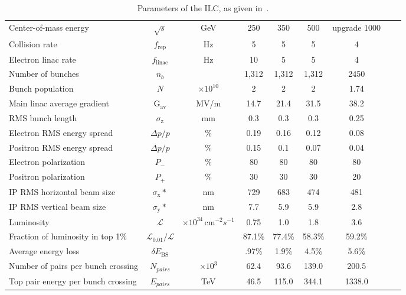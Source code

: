         \begin{landscape}
        \begin{table}
        \begin{center}
        \begin{tabular}{|lcc|c|c|c|c|c|c|}
                \hline
                Center-of-mass energy &$\sqrt{s}$ &GeV  			& 250 & 350 & 500 & upgrade 1000 \\ 
                Collision rate &$f_{\text{rep}}$ &Hz  				& 5 & 5 & 5 & 4 \\ 
                Electron linac rate &$f_{\text{linac}}$ &Hz  		& 10 & 5 & 5 & 4 \\ 
                Number of bunches &$n_b$ &							& 1,312 & 1,312 & 1,312 & 2450 \\ 
                Bunch population &$N$ &$\times 10^{10}$ 			& 2 & 2 & 2 & 1.74 \\ 
                Main linac average gradient &G$_{\text{av}}$ &MV/m  & 14.7 & 21.4 & 31.5 & 38.2 \\  \hline

                RMS bunch length &$\sigma_{\text{z}}$ &mm 			& 0.3 & 0.3 & 0.3 & 0.25 \\ 
                Electron RMS energy spread &$\Delta p/p$ &\%  		& 0.19 & 0.16 & 0.12 & 0.08 \\ 
                Positron RMS energy spread &$\Delta p/p$ &\%  		& 0.15 & 0.1 & 0.07 & 0.04 \\ 
                Electron polarization &$P_-$ &\%  					& 80 & 80 & 80 & 80 \\ 
                Positron polarization &$P_+$ &\%  					& 30 & 30 & 30 & 20 \\ 
                IP RMS horizontal beam size &$\sigma_{\text{x}}*$ &nm& 729 & 683 & 474 & 481 \\ 

                IP RMS vertical beam size &$\sigma_{\text{y}}*$ &nm  & 7.7 & 5.9 & 5.9 & 2.8 \\ \hline
                Luminosity &$\mathcal{L}$ &$\times 10^{34}$\,cm$^{-2}s^{-1}$ & 0.75 & 1.0 & 1.8 & 3.6 \\ 
                Fraction of luminosity in top 1\% &$\mathcal{L}_{0.01}/\mathcal{L}$ & & 87.1\% & 77.4\% & 58.3\% & 59.2\% \\ 
                Average energy loss &$\delta E_{\text{BS}}$&  & .97\% & 1.9\% & 4.5\% & 5.6\% \\  \hline
				Number of pairs per bunch crossing &$N_{pairs}$ &$\times 10^3$ & 62.4 & 93.6 & 139.0 & 200.5 \\ 
                Top pair energy per bunch crossing &$E_{pairs}$ &TeV & 46.5 & 115.0 & 344.1 & 1338.0 \\ \hline
        \end{tabular}
        \end{center}
        \caption{Parameters of the ILC, as given in~\cite{bib:ILC}. }
        \label{tab:ILCparam}
        \end{table}
        \end{landscape}
